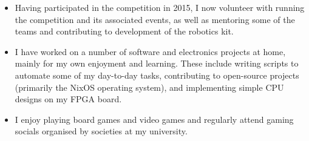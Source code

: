 
\begin{itemize}
  \item Having participated in the \studentrobotics{} competition in 2015, I now volunteer with running the competition and its associated events, as well as mentoring some of the teams and contributing to development of the robotics kit.
  \item I have worked on a number of software and electronics projects at home, mainly for my own enjoyment and learning. These include writing scripts to automate some of my day-to-day tasks, contributing to open-source projects (primarily the NixOS operating system), and implementing simple CPU designs on my FPGA board.
  \item I enjoy playing board games and video games and regularly attend gaming socials organised by societies at my university.
\end{itemize}
